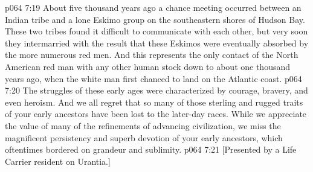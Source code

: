 \vs p064 7:19 About five thousand years ago a chance meeting occurred between an Indian tribe and a lone Eskimo group on the southeastern shores of Hudson Bay. These two tribes found it difficult to communicate with each other, but very soon they intermarried with the result that these Eskimos were eventually absorbed by the more numerous red men. And this represents the only contact of the North American red man with any other human stock down to about one thousand years ago, when the white man first chanced to land on the Atlantic coast.
\pc \vs p064 7:20 The struggles of these early ages were characterized by courage, bravery, and even heroism. And we all regret that so many of those sterling and rugged traits of your early ancestors have been lost to the later\hyp{}day races. While we appreciate the value of many of the refinements of advancing civilization, we miss the magnificent persistency and superb devotion of your early ancestors, which oftentimes bordered on grandeur and sublimity.
\vsetoff
\vs p064 7:21 [Presented by a Life Carrier resident on Urantia.]
